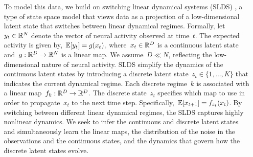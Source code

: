 \documentclass[11pt]{article}
\begin{document}
To model this data, we build on switching linear dynamical systems
(SLDS) \citep{chang1978state, ackerson1970state, hamilton1990analysis,
  ghahramani1996switching, murphy1998switching}, a type of state space
model that views data as a projection of a low-dimensional latent
state that switches between linear dynamical regimes.  Formally,
let~$y_t \in \mathbb{R}^N$ denote the vector of neural activity observed
at time~$t$.  The expected activity is given by,~$\mathbb{E}[y_t] = g(x_t)$,
where~$x_t \in \mathbb{R}^D$ is a continuous latent state
and~$g: \mathbb{R}^D \to \mathbb{R}^N$ is a linear map. We assume~$D \ll N$,
reflecting the low-dimensional nature of neural activity. SLDS
simplify the dynamics of the continuous latent states by introducing a
discrete latent state~$z_t \in \{1, \ldots, K\}$ that indicates the
current dynamical regime.  Each discrete regime~$k$ is associated with
a linear map~$f_k: \mathbb{R}^D \to \mathbb{R}^D$. The discrete state~$z_t$
specifies which map to use in order to propagate~$x_t$ to the next
time step.  Specifically,~$\mathbb{E}[x_{t+1}] = f_{z_t}(x_t)$. By switching
between different linear dynamical regimes, the SLDS captures highly
nonlinear dynamics.  We seek to infer the continuous and discrete
latent states and simultaneously learn the linear maps, the
distribution of the noise in the observations and the continuous
states, and the dynamics that govern how the discrete latent states
evolve.




\end{document}
